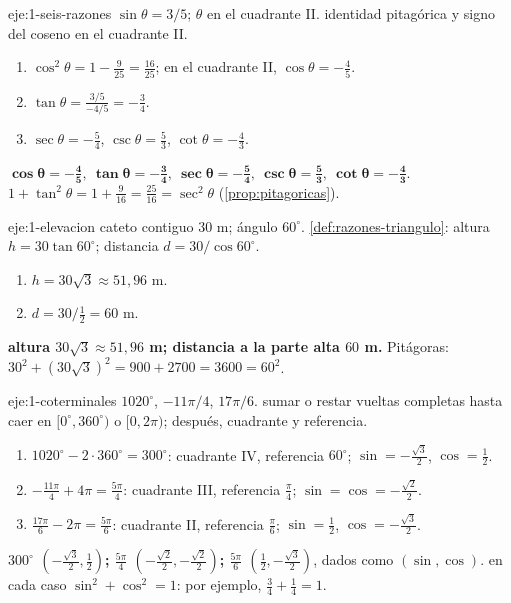 \begin{solucion}{eje:1-seis-razones}
\datos $\sin\theta=3/5$; $\theta$ en el cuadrante II.
\planteamiento identidad pitagórica y signo del coseno en el cuadrante II.
\pasos
\begin{enumerate}[label=\arabic*.]
  \item $\cos^{2}\theta=1-\frac{9}{25}=\frac{16}{25}$; en el cuadrante II, $\cos\theta=-\frac45$.
  \item $\tan\theta=\frac{3/5}{-4/5}=-\frac34$.
  \item $\sec\theta=-\frac54$, $\csc\theta=\frac53$, $\cot\theta=-\frac43$.
\end{enumerate}
\resultado $\mathbf{\cos\theta=-\tfrac45,\ \tan\theta=-\tfrac34,\ \sec\theta=-\tfrac54,\ \csc\theta=\tfrac53,\ \cot\theta=-\tfrac43}$.
\comprobacion $1+\tan^{2}\theta=1+\frac{9}{16}=\frac{25}{16}=\sec^{2}\theta$ (\cref{prop:pitagoricas}).
\end{solucion}

\begin{solucion}{eje:1-elevacion}
\datos cateto contiguo $30$ m; ángulo $60^{\circ}$.
\planteamiento \cref{def:razones-triangulo}: altura $h=30\tan60^{\circ}$; distancia $d=30/\cos60^{\circ}$.
\pasos
\begin{enumerate}[label=\arabic*.]
  \item $h=30\sqrt3\approx51{,}96$ m.
  \item $d=30/\frac12=60$ m.
\end{enumerate}
\resultado \textbf{altura $30\sqrt3\approx51{,}96$ m; distancia a la parte alta $60$ m.}
\comprobacion Pitágoras: $30^{2}+(30\sqrt3)^{2}=900+2700=3600=60^{2}$.
\end{solucion}

\begin{solucion}{eje:1-coterminales}
\datos $1020^{\circ}$, $-11\pi/4$, $17\pi/6$.
\planteamiento sumar o restar vueltas completas hasta caer en $[0^{\circ},360^{\circ})$ o $[0,2\pi)$; después, cuadrante y referencia.
\pasos
\begin{enumerate}[label=\arabic*.]
  \item $1020^{\circ}-2\cdot360^{\circ}=300^{\circ}$: cuadrante IV, referencia $60^{\circ}$; $\sin=-\frac{\sqrt3}{2}$, $\cos=\frac12$.
  \item $-\frac{11\pi}{4}+4\pi=\frac{5\pi}{4}$: cuadrante III, referencia $\frac{\pi}{4}$; $\sin=\cos=-\frac{\sqrt2}{2}$.
  \item $\frac{17\pi}{6}-2\pi=\frac{5\pi}{6}$: cuadrante II, referencia $\frac{\pi}{6}$; $\sin=\frac12$, $\cos=-\frac{\sqrt3}{2}$.
\end{enumerate}
\resultado \textbf{$300^{\circ}$ $(-\frac{\sqrt3}{2},\frac12)$; $\frac{5\pi}{4}$ $(-\frac{\sqrt2}{2},-\frac{\sqrt2}{2})$; $\frac{5\pi}{6}$ $(\frac12,-\frac{\sqrt3}{2})$}, dados como $(\sin,\cos)$.
\comprobacion en cada caso $\sin^{2}+\cos^{2}=1$: por ejemplo, $\frac34+\frac14=1$.
\end{solucion}

